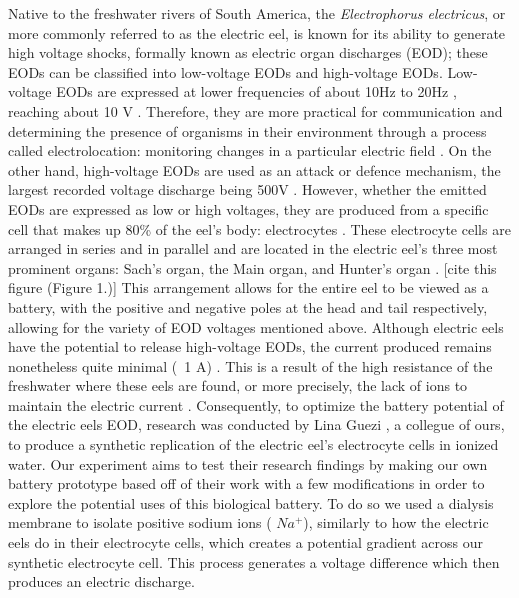 \documentclass[letterpaper]{article}
\begin{document}
Native to the freshwater rivers of South America, the \textit{Electrophorus electricus}, or more 
commonly referred to as the electric eel, is known for its ability to generate high voltage shocks,
formally known as electric organ discharges (EOD); these EODs can be classified into low-voltage 
EODs and high-voltage EODs. Low-voltage EODs are expressed at lower frequencies of about 10Hz to
20Hz \parencite{cataniaAstonishingBehaviorElectric2019}, reaching about 10 V \parencite{ElectricCircuits6ElectricEels2015}. 
Therefore, they are more practical for communication and determining the presence of organisms 
in their environment through a process called electrolocation: monitoring 
changes in a particular electric field \parencite{bennettComparativePhysiologyElectric1970}. 
On the other hand, high-voltage EODs are used as an attack or defence mechanism,
the largest recorded voltage discharge being 500V \parencite{ElectricCircuits6ElectricEels2015}.
However, whether the emitted EODs are expressed as low or high 
voltages, they are produced from a specific cell that makes up 80\% of the eel’s body: electrocytes
\parencite{carlsonAnimalBehaviorElectric2015}. These electrocyte cells are arranged in series and 
in parallel and are located in the electric eel’s three most prominent organs: Sach’s organ, the 
Main organ, and Hunter’s organ \parencite{ElectricCircuits6ElectricEels2015}. [cite this figure (Figure 1.)] This 
arrangement allows for the entire eel to be viewed as a battery, with the positive and negative 
poles at the head and tail respectively, allowing for the variety of EOD voltages mentioned above. 
Although electric eels have the potential to release high-voltage EODs, the current produced remains
nonetheless quite minimal (~1 A) \parencite{ElectricCircuits6ElectricEels2015}. This is a result 
of the high resistance of the freshwater where these eels are found, or more precisely, the lack of 
ions to maintain the electric current \parencite{boisseletBiomimeticPotentialElectric2017}. 
Consequently, to optimize the battery potential of the electric eels EOD, research was conducted 
by Lina Guezi \parencite{gueziTheoreticalExaminationConception2023}, a collegue of ours, to produce 
a synthetic replication of the electric eel’s electrocyte 
cells in ionized water. Our experiment aims to test their research findings by making our own battery prototype based off of their work with a few modifications in order to explore 
the potential uses of this biological battery. To do so we used a dialysis membrane to isolate positive sodium ions ( $Na^+$), similarly to how the electric eels do in their
electrocyte cells, which creates a potential gradient across our synthetic electrocyte cell. This process generates a voltage difference 
which then produces an electric discharge. 
\end{document}
